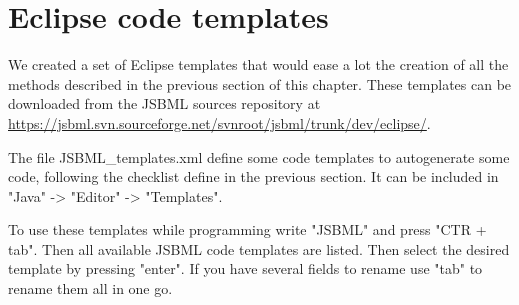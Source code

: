 
\section{Eclipse code templates}

We created a set of Eclipse templates that would ease a lot the creation of all 
the methods described in the previous section of this chapter. These templates
can be downloaded from the JSBML sources repository at 
\url{https://jsbml.svn.sourceforge.net/svnroot/jsbml/trunk/dev/eclipse/}.

The file JSBML\_templates.xml define some code templates to autogenerate some code, following the
checklist define in the previous section.
It can be included in "Java" -> "Editor" -> "Templates".

To use these templates while programming write "JSBML" and press "CTR + tab". Then all 
available JSBML code templates are listed. Then select the desired template by pressing 
"enter". If you have several fields to rename use "tab" to rename them all in one go.
